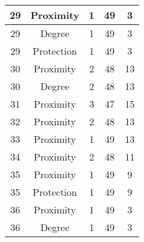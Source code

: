 \documentclass[results.tex]{subfiles}
\begin{document}
\begin{center}
\begin{tabular}{| c || c | c | c | c |}
            \hline
            29                      & Proximity                    & 1                      & 49                      & 3                    \\
            \hline
            29                      & Degree                       & 1                      & 49                      & 3                    \\
            \hline
            29                      & Protection                   & 1                      & 49                      & 3                    \\
            \hline
            30                      & Proximity                    & 2                      & 48                      & 13                   \\
            \hline
            30                      & Degree                       & 2                      & 48                      & 13                   \\
            \hline
            31                      & Proximity                    & 3                      & 47                      & 15                   \\
            \hline
            32                      & Proximity                    & 2                      & 48                      & 13                   \\
            \hline
            33                      & Proximity                    & 1                      & 49                      & 13                   \\
            \hline
            34                      & Proximity                    & 2                      & 48                      & 11                   \\
            \hline
            35                      & Proximity                    & 1                      & 49                      & 9                    \\
            \hline
            35                      & Protection                   & 1                      & 49                      & 9                    \\
            \hline
            36                      & Proximity                    & 1                      & 49                      & 3                    \\
            \hline
            36                      & Degree                       & 1                      & 49                      & 3                    \\

\end{tabular}
\end{center}
\end{document}
